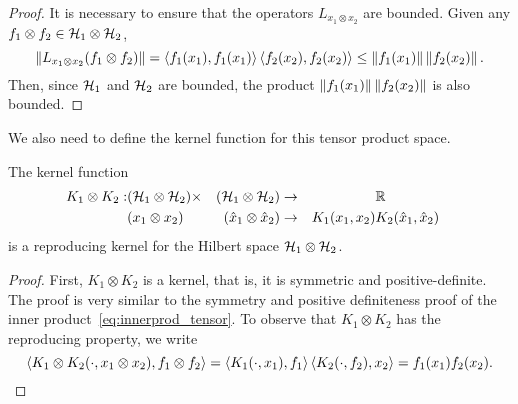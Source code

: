 \begin{proof}
    It is necessary to ensure that the operators $L_{x_1 \otimes x_2}$ are bounded. Given any $f_1 \otimes f_2 \in \mathcal{H}_1 \otimes \mathcal{H}_2$, 
    $$ \left\lVert L_{x_1 \otimes x_2} (f_1 \otimes f_2)\right\rVert = \left\langle f_1(x_1), f_1(x_1) \right\rangle \left\langle f_2(x_2), f_2(x_2) \right\rangle \leq \left\lVert f_1(x_1)\right\rVert  \left\lVert f_2(x_2)\right\rVert .$$
    Then, since $\mathcal{H}_1$ and $\mathcal{H}_2$ are bounded, the product 
$ \left\lVert f_1(x_1)\right\rVert  \left\lVert f_2(x_2)\right\rVert $
is also bounded.
\end{proof}

%
We also need to define the kernel function for this tensor product space.
\begin{proposition}
    The kernel function
    \begin{equation}
        \nonumber
        \begin{aligned}
            K_1 \otimes K_2: &(\mathcal{H}_1 \otimes \mathcal{H}_2) \times &(\mathcal{H}_1 \otimes \mathcal{H}_2) &\to && \mathbb{R} & \\
        &(x_1 \otimes x_2) &(\hat{x}_1 \otimes \hat{x}_2) &\to & K_1(x_1, x_2)  & K_2(\hat{x}_1, \hat{x}_2) &
        \end{aligned}
    \end{equation}
    is a reproducing kernel for the Hilbert space $\mathcal{H}_1 \otimes \mathcal{H}_2$.
\end{proposition} 
\begin{proof}
    First, $K_1 \otimes K_2$ is a kernel, that is, it is symmetric and positive-definite. The proof is very similar to the symmetry and positive definiteness proof of the inner product~\eqref{eq:innerprod_tensor}.
    To observe that $K_1 \otimes K_2$ has the reproducing property, we write
    $$ \left\langle K_1 \otimes K_2 (\cdot, x_1 \otimes x_2), f_1 \otimes f_2 \right\rangle = \left\langle K_1(\cdot, x_1), f_1 \right\rangle \left\langle K_2(\cdot, f_2), x_2 \right\rangle = f_1(x_1) f_2(x_2) .$$
\end{proof}
